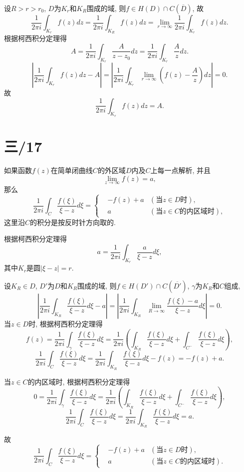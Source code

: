 \documentclass[11pt,a4paper]{article}
\begin{document}
设$R>r>r_0$, $D$为$K_r$和$K_R$围成的域, 则$f\in H(D)\cap C(\overline{D})$, 故
$$\frac{1}{2\pi i}\int_{K_r}f(z)dz=\frac{1}{2\pi i}\int_{K_R}f(z)dz=\lim_{r\to\infty}\frac{1}{2\pi i}\int_{K_r}f(z)dz.$$
根据柯西积分定理得
$$A=\frac{1}{2\pi i}\int_{K_r}\frac{A}{z-z_0}dz=\frac{1}{2\pi i}\int_{K_r}\frac{A}{z}dz.$$
$$\left|\frac{1}{2\pi i}\int_{K_r}f(z)dz-A\right|=\left|\frac{1}{2\pi i}\int_{K_r}\lim_{r\to\infty}\left(f(z)-\frac{A}{z}\right)dz\right|=0.$$
故$$\frac{1}{2\pi i}\int_{K_r}f(z)dz=A.$$

\section{三/17}
\begin{problem}
如果函数$f(z)$在简单闭曲线$C$的外区域$D$内及$C$上每一点解析, 并且
$$\lim_{z\to\infty}f(z)=a,$$
那么
$$\frac{1}{2\pi i}\int_C\frac{f(\xi)}{\xi-z}d\xi=\left\{\begin{aligned}
     & -f(z)+a & (\text{当}z\in D\text{时}),         \\
     & a       & (\text{当}z\in C\text{的内区域时}),
  \end{aligned}\right.$$
这里沿$C$的积分是按反时针方向取的.
\end{problem}

根据柯西积分定理得
$$a=\frac{1}{2\pi i}\int_{K_r}\frac{a}{\xi-z}d\xi,$$
其中$K_r$是圆$|\xi-z|=r$. \medskip

设$K_R\in D$, $D'$为$D$和$K_R$围成的域, 则$f\in H(D')\cap C(\overline{D'})$, $\gamma$为$K_R$和$C$组成,
$$\left|\frac{1}{2\pi i}\int_{K_R}\frac{f(\xi)}{\xi-z}d\xi-a\right|=\left|\frac{1}{2\pi i}\int_{K_R}\lim_{R\to\infty}\frac{f(\xi)-a}{\xi-z}d\xi\right|=0.$$
当$z\in D$时, 根据柯西积分定理得
$$f(z)=\frac{1}{2\pi i}\int_\gamma\frac{f(\xi)}{\xi-z}d\xi=\frac{1}{2\pi i}\left(\int_{K_R}\frac{f(\xi)}{\xi-z}d\xi+\int_{C^-}\frac{f(\xi)}{\xi-z}d\xi\right),$$
$$\frac{1}{2\pi i}\int_{C}\frac{f(\xi)}{\xi-z}d\xi=\frac{1}{2\pi i}\int_{K_R}\frac{f(\xi)}{\xi-z}d\xi-f(z)=-f(z)+a.$$

当$z\in C$的内区域时, 根据柯西积分定理得
$$0=\frac{1}{2\pi i}\int_\gamma\frac{f(\xi)}{\xi-z}d\xi=\frac{1}{2\pi i}\left(\int_{K_R}\frac{f(\xi)}{\xi-z}d\xi+\int_{C^-}\frac{f(\xi)}{\xi-z}d\xi\right),$$
$$\frac{1}{2\pi i}\int_{C}\frac{f(\xi)}{\xi-z}d\xi=\frac{1}{2\pi i}\int_{K_R}\frac{f(\xi)}{\xi-z}d\xi=a.$$

故$$\frac{1}{2\pi i}\int_C\frac{f(\xi)}{\xi-z}d\xi=\left\{\begin{aligned}
     & -f(z)+a & (\text{当}z\in D\text{时}),         \\
     & a       & (\text{当}z\in C\text{的内区域时}).
  \end{aligned}\right.$$
\end{document}
